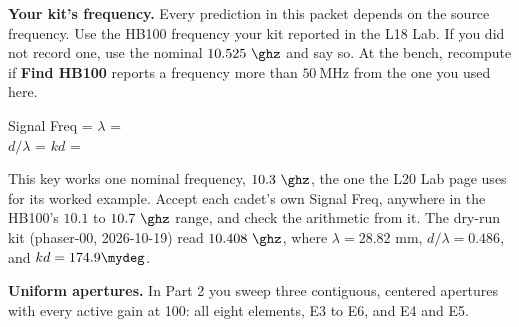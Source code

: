 \documentclass{exam}
\begin{document}
\begin{questions}


\question \textbf{Your kit's frequency.} Every prediction in this packet depends
on the source frequency. Use the HB100 frequency your kit reported in the L18
Lab. If you did not record one, use the nominal $10.525\ \ghz$ and say so. At the
bench, recompute if \textbf{Find HB100} reports a frequency more than
$50\ \text{MHz}$ from the one you used here.

\begin{center}
Signal Freq =  \hspace{0.25in}
$\lambda$ =  \\[10pt]
$d/\lambda$ =  \hspace{0.25in}
$kd$ = \ansbox[1.1in]{$173.0\mydeg$}
\end{center}

\begin{solution}
This key works one nominal frequency, $10.3\ \ghz$, the one the L20 Lab page
uses for its worked example. Accept each cadet's own Signal Freq, anywhere in
the HB100's $10.1$ to $10.7\ \ghz$ range, and check the arithmetic from it.
The dry-run kit (phaser-00, 2026-10-19) read $10.408\ \ghz$, where
$\lambda = 28.82$ mm, $d/\lambda = 0.486$, and $kd = 174.9\mydeg$.
\end{solution}

\question \textbf{Uniform apertures.} In Part 2 you sweep three contiguous,
centered apertures with every active gain at 100: all eight elements, E3 to E6,
and E4 and E5.

\end{questions}
\end{document}
